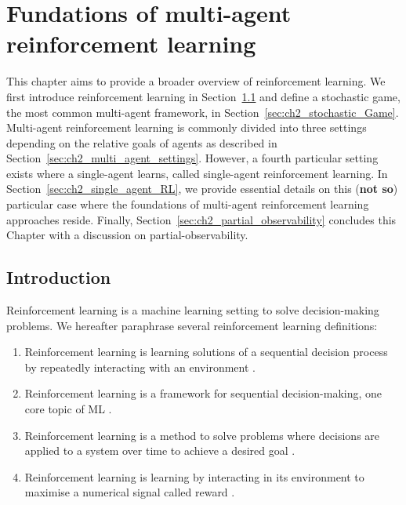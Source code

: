 \chapter{Fundations of multi-agent reinforcement learning} \label{ch:marl}

\begin{chapter_outline}

This chapter aims to provide a broader overview of reinforcement learning.
We first introduce reinforcement learning in Section~\ref{sec:ch2_Introduction} and define a stochastic game, the most common multi-agent framework, in Section~\ref{sec:ch2_stochastic_Game}.
Multi-agent reinforcement learning is commonly divided into three settings depending on the relative goals of agents as described in Section~\ref{sec:ch2_multi_agent_settings}.
However, a fourth particular setting exists where a single-agent learns, called single-agent reinforcement learning.
In Section~\ref{sec:ch2_single_agent_RL}, we provide essential details on this (\textbf{not so}) particular case where the foundations of multi-agent reinforcement learning approaches reside.
Finally, Section~\ref{sec:ch2_partial_observability} concludes this Chapter with a discussion on partial-observability.

\end{chapter_outline}

\section{Introduction} 
\label{sec:ch2_Introduction}
Reinforcement learning is a machine learning setting to solve decision-making problems.
We hereafter paraphrase several reinforcement learning definitions:
\begin{enumerate}
\item Reinforcement learning is learning solutions of a sequential decision process by repeatedly interacting with an environment \citep{marl-book}.
\item Reinforcement learning is a framework for sequential decision-making, one core topic of ML \citep{introDeepRL}.
\item Reinforcement learning is a method to solve problems where decisions are applied to a system over time to achieve a desired goal \citep{BusoniuErnstBook}.
\item Reinforcement learning is learning by interacting in its environment to maximise a numerical signal called reward \citep{sutton2018reinforcement}.
\end{enumerate}

